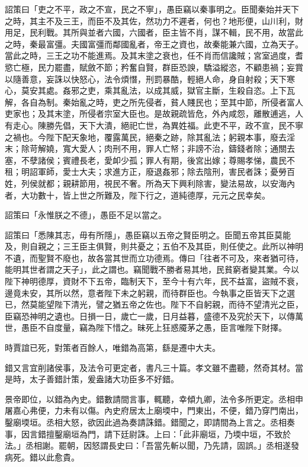 \begin{pinyinscope}
詔策曰「吏之不平，政之不宣，民之不寧」，愚臣竊以秦事明之。臣聞秦始并天下之時，其主不及三王，而臣不及其佐，然功力不遲者，何也？地形便，山川利，財用足，民利戰。其所與並者六國，六國者，臣主皆不肖，謀不輯，民不用，故當此之時，秦最富彊。夫國富彊而鄰國亂者，帝王之資也，故秦能兼六國，立為天子。當此之時，三王之功不能進焉。及其末塗之衰也，任不肖而信讒賊；宮室過度，耆慾亡極，民力罷盡，賦斂不節；矜奮自賢，群臣恐諛，驕溢縱恣，不顧患禍；妄賞以隨善意，妄誅以快怒心，法令煩憯，刑罰暴酷，輕絕人命，身自射殺；天下寒心，莫安其處。姦邪之吏，乘其亂法，以成其威，獄官主斷，生殺自恣。上下瓦解，各自為制。秦始亂之時，吏之所先侵者，貧人賤民也；至其中節，所侵者富人吏家也；及其末塗，所侵者宗室大臣也。是故親疏皆危，外內咸怨，離散逋逃，人有走心。陳勝先倡，天下大潰，絕祀亡世，為異姓福。此吏不平，政不宣，民不寧之禍也。今陛下配天象地，覆露萬民，絕秦之跡，除其亂法；躬親本事，廢去淫末；除苛解嬈，寬大愛人；肉刑不用，罪人亡帑；非謗不治，鑄錢者除；通關去塞，不孽諸侯；賓禮長老，愛卹少孤；罪人有期，後宮出嫁；尊賜孝悌，農民不租；明詔軍師，愛士大夫；求進方正，廢退姦邪；除去陰刑，害民者誅；憂勞百姓，列侯就都；親耕節用，視民不奢。所為天下興利除害，變法易故，以安海內者，大功數十，皆上世之所難及，陛下行之，道純德厚，元元之民幸矣。

詔策曰「永惟朕之不德」，愚臣不足以當之。

詔策曰「悉陳其志，毋有所隱」，愚臣竊以五帝之賢臣明之。臣聞五帝其臣莫能及，則自親之；三王臣主俱賢，則共憂之；五伯不及其臣，則任使之。此所以神明不遺，而聖賢不廢也，故各當其世而立功德焉。傳曰「往者不可及，來者猶可待，能明其世者謂之天子」，此之謂也。竊聞戰不勝者易其地，民貧窮者變其業。今以陛下神明德厚，資財不下五帝，臨制天下，至今十有六年，民不益富，盜賊不衰，邊竟未安，其所以然，意者陛下未之躬親，而待群臣也。今執事之臣皆天下之選已，然莫能望陛下清光，譬之猶五帝之佐也。陛下不自躬親，而待不望清光之臣，臣竊恐神明之遺也。日損一日，歲亡一歲，日月益暮，盛德不及究於天下，以傳萬世，愚臣不自度量，竊為陛下惜之。昧死上狂惑魇茅之愚，臣言唯陛下財擇。

時賈誼已死，對策者百餘人，唯錯為高第，繇是遷中大夫。

錯又言宜削諸侯事，及法令可更定者，書凡三十篇。孝文雖不盡聽，然奇其材。當是時，太子善錯計策，爰盎諸大功臣多不好錯。

景帝即位，以錯為內史。錯數請間言事，輒聽，幸傾九卿，法令多所更定。丞相申屠嘉心弗便，力未有以傷。內史府居太上廟堧中，門東出，不便，錯乃穿門南出，鑿廟堧垣。丞相大怒，欲因此過為奏請誅錯。錯聞之，即請間為上言之。丞相奏事，因言錯擅鑿廟垣為門，請下廷尉誅。上曰：「此非廟垣，乃堧中垣，不致於法。」丞相謝。罷朝，因怒謂長史曰：「吾當先斬以聞，乃先請，固誤。」丞相遂發病死。錯以此愈貴。


\end{pinyinscope}
